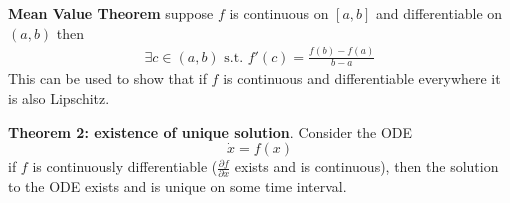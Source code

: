 \textbf{Mean Value Theorem} 
suppose \(f\) is continuous on \([a,b]\) and differentiable on \((a,b)\) then
\begin{align*}
    \exists c\in(a,b) \textrm{ s.t. } f'(c)=\frac{f(b)-f(a)}{b-a}
\end{align*}
This can be used to show that if \(f\) is continuous and differentiable everywhere it is also Lipschitz.
\newline

\textbf{Theorem 2: existence of unique solution}. Consider the ODE
\[\dot{x}=f(x)\]
if \(f\) is continuously differentiable (\(\frac{\partial f}{\partial x}\) exists and is continuous), then the solution to the ODE exists and is unique on some time interval.

